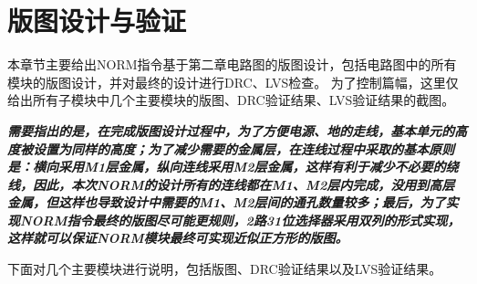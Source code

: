 \chapter{版图设计与验证}
本章节主要给出NORM指令基于第二章电路图的版图设计，包括电路图中的所有模块的版图设计，并对最终的设计进行DRC、LVS检查。
为了控制篇幅，这里仅给出所有子模块中几个主要模块的版图、DRC验证结果、LVS验证结果的截图。

{
\itshape
\bfseries
需要指出的是，在完成版图设计过程中，为了方便电源、地的走线，基本单元的高度被设置为同样的高度；为了减少需要的金属层，在连线过程中采取的基本原则是：横向采用M1层金属，纵向连线采用M2层金属，这样有利于减少不必要的绕线，因此，本次NORM的设计所有的连线都在M1、M2层内完成，没用到高层金属，但这样也导致设计中需要的M1、M2层间的通孔数量较多；最后，为了实现NORM指令最终的版图尽可能更规则，2路31位选择器采用双列的形式实现，这样就可以保证NORM模块最终可实现近似正方形的版图。
}

下面对几个主要模块进行说明，包括版图、DRC验证结果以及LVS验证结果。

